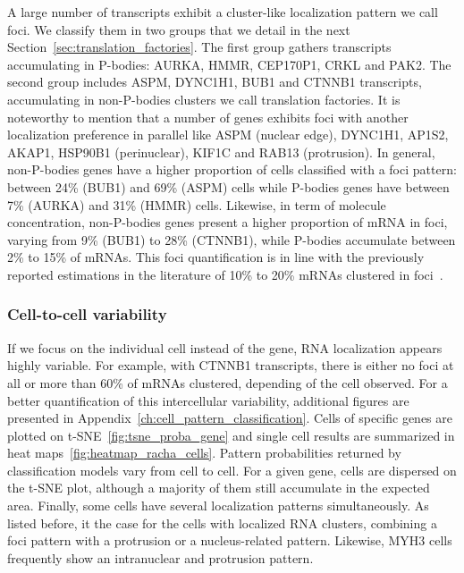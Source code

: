 A large number of transcripts exhibit a cluster-like localization pattern we call foci.
We classify them in two groups that we detail in the next Section~\ref{sec:translation_factories}.
The first group gathers transcripts accumulating in \ac{P-bodies}: AURKA, HMMR, CEP170P1, CRKL and PAK2.
The second group includes ASPM, DYNC1H1, BUB1 and CTNNB1 transcripts, accumulating in non-\ac{P-bodies} clusters we call translation factories.
It is noteworthy to mention that a number of genes exhibits foci with another localization preference in parallel like ASPM (nuclear edge), DYNC1H1, AP1S2, AKAP1, HSP90B1 (perinuclear), KIF1C and RAB13 (protrusion).
In general, non-\ac{P-bodies} genes have a higher proportion of cells classified with a foci pattern: between 24\% (BUB1) and 69\% (ASPM) cells while \ac{P-bodies} genes have between 7\% (AURKA) and 31\% (HMMR) cells.
Likewise, in term of molecule concentration, non-\ac{P-bodies} genes present a higher proportion of \ac{mRNA} in foci, varying from 9\% (BUB1) to 28\% (CTNNB1), while \ac{P-bodies} accumulate between 2\% to 15\% of \ac{mRNA}s.
This foci quantification is in line with the previously reported estimations in the literature of 10\% to 20\% \ac{mRNA}s clustered in foci~\cite{Pillai_2005, Hubstenberger_2017}.

\subsubsection{Cell-to-cell variability}

If we focus on the individual cell instead of the gene, \ac{RNA} localization appears highly variable.
For example, with CTNNB1 transcripts, there is either no foci at all or more than 60\% of \ac{mRNA}s clustered, depending of the cell observed.
For a better quantification of this intercellular variability, additional figures are presented in Appendix~\ref{ch:cell_pattern_classification}.
Cells of specific genes are plotted on \ac{t-SNE}~\ref{fig:tsne_proba_gene} and single cell results are summarized in heat maps~\ref{fig:heatmap_racha_cells}.
Pattern probabilities returned by classification models vary from cell to cell.
For a given gene, cells are dispersed on the \ac{t-SNE} plot, although a majority of them still accumulate in the expected area.
Finally, some cells have several localization patterns simultaneously.
As listed before, it the case for the cells with localized \ac{RNA} clusters, combining a foci pattern with a protrusion or a nucleus-related pattern.
Likewise, MYH3 cells frequently show an intranuclear and protrusion pattern.


